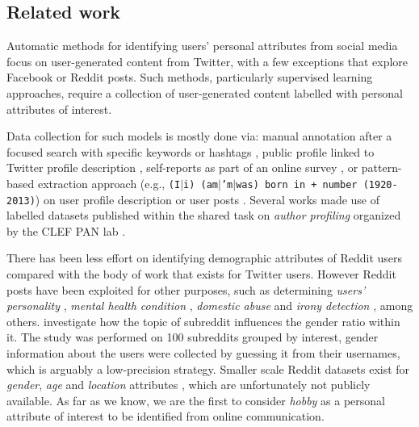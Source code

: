 \subsection{Related work}

Automatic methods for identifying users' personal attributes 
from social media focus on user-generated content from Twitter, with a few exceptions that explore Facebook \cite{sap:EMNLP14,Schwartz2013PersonalityGA} or Reddit \cite{fabian2015privacy,finlay2014age,gjurkovic-EtAl:2018} posts.
Such methods, particularly supervised learning approaches, require a collection of user-generated content labelled with personal attributes of interest.

Data collection for such models is mostly done via: manual annotation after a focused search with specific keywords or hashtags \cite{pietro:ACL15,Rao:2010}, public profile linked to Twitter profile description \cite{burger:EMNLP11,flekova:ACL16:long}, self-reports as part of an online survey \cite{finlay2014age,flekova:ACL16:long,pietro:ACL17:long,pietro:COLING18,sap:EMNLP14,schwartz2013personality}, or pattern-based extraction approach 
(e.g., \texttt{\small(I$|$i) (am$|$'m$|$was) born in + number (1920-2013)}) on user profile description or user posts \cite{fabian2015privacy,kim:ACL17:short,sloan2015tweets,tigunova2019listening}.
Several works \cite{basile:2017,bayot:MOD17} made use of labelled datasets published within the shared task on \textit{author profiling} organized by the CLEF PAN lab \cite{stein:2017o,stein:2017l}. 

There has been less effort on identifying demographic attributes of Reddit users compared with the body of work that exists for Twitter users. However Reddit posts have been exploited for other purposes, such as determining \emph{users' personality} \cite{gjurkovic-EtAl:2018}, \emph{mental health condition} \cite{cohan2018smhd}, \emph{domestic abuse} \cite{schrading2015analysis} and \emph{irony detection} \cite{wallace2014humans}, among others.
\citet{thelwall2018she} investigate how the topic of subreddit influences the gender ratio within it. The study was performed on 100 subreddits grouped by interest, gender information about the users were collected by guessing it from their usernames, which is arguably a low-precision strategy. Smaller scale Reddit datasets exist for \emph{gender}, \emph{age} and \emph{location} attributes \cite{fabian2015privacy,finlay2014age}, which are unfortunately not publicly available. As far as we know, we are the first to consider \textit{hobby} as a personal attribute of interest to be identified from online communication.

